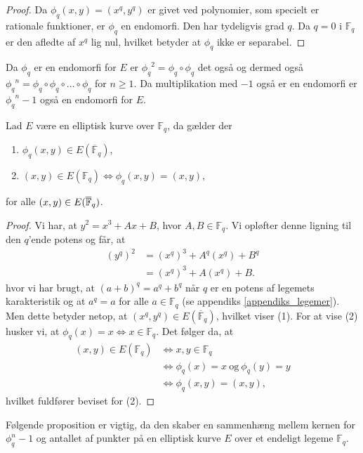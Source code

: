 \begin{proof}
Da $\phi_q(x, y) = (x^q, y^q)$ er givet ved polynomier, som specielt er rationale funktioner, er $\phi_q$ en endomorfi. Den har tydeligvis grad $q$. Da $q=0$ i $\mathbb{F}_q$ er den afledte af $x^q$ lig nul, hvilket betyder at $\phi_q$ ikke er separabel.
\end{proof}

\begin{remark}
Da $\phi_q$ er en endomorfi for $E$ er ${\phi_q}^2 = \phi_q \circ \phi_q$ det også og dermed også 
${\phi_q}^n = \phi_q \circ \phi_q \circ \ldots \circ \phi_q$ for $n \geq 1$. Da multiplikation med $-1$ også er en endomorfi er ${\phi_q}^n - 1$ også en endomorfi for $E$.
\end{remark}

\begin{lemma}
\label{lemma03}
Lad $E$ være en elliptisk kurve over $\mathbb{F}_q$, da gælder der
\begin{enumerate}
	\item $\phi_q(x, y) \in E(\overline{\mathbb{F}}_q)$,
	\item $(x, y) \in E(\mathbb{F}_q) \Leftrightarrow \phi_q(x, y)=(x, y)$,
\end{enumerate}
for alle $(x, y) \in E(\overline{\mathbb{F}}_q)$.
\end{lemma}
\begin{proof}
Vi har, at $y^2 = x^3 + Ax + B$, hvor $A, B \in \mathbb{F}_q$. Vi opløfter 
denne ligning til den $q$'ende potens og får, at 
\begin{align*}
	(y^q)^2 &= (x^q)^3 + A^q (x^q) + B^q \\
	&= (x^q)^3 + A (x^q) + B.
\end{align*}
hvor vi har brugt, at $(a+b)^q = a^q + b^q$ når $q$ er en potens af legemets karakteristik 
og at $a^q = a$ for alle $a \in \mathbb{F}_q$ (se appendiks \ref{appendiks_legemer}).
Men dette betyder netop, at 
$(x^q, y^q) \in E(\overline{\mathbb{F}}_q)$, hvilket viser (1).
For at vise (2) husker vi, at $\phi_q(x) = x \Leftrightarrow x \in \mathbb{F}_q$.
Det følger da, at 
\begin{align*}
	(x, y) \in E(\mathbb{F}_q) &\Leftrightarrow x, y \in \mathbb{F}_q \\
	&\Leftrightarrow \phi_q(x) = x \ \text{og} \ \phi_q(y) = y \\
	&\Leftrightarrow \phi_q(x, y) = (x, y),
\end{align*}
hvilket fuldfører beviset for (2).
\end{proof}

Følgende proposition er vigtig, da den skaber en sammenhæng mellem kernen for $\phi_{q}^{n} - 1$ og antallet af punkter på en elliptisk kurve $E$ over et endeligt legeme $\mathbb{F}_{q}$.


